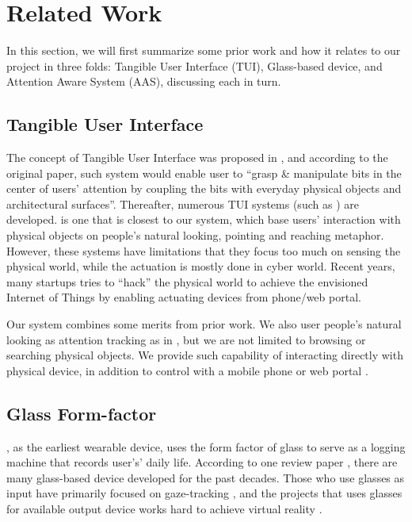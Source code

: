 \section{Related Work}
\label{sec:related-work}

In this section, we will first summarize some prior work and how it relates to our project in three folds: Tangible User Interface (TUI), Glass-based device, and Attention Aware System (AAS), discussing each in turn. 

\subsection{Tangible User Interface}
\label{sec:tang-user-interf}

The concept of Tangible User Interface was proposed in \cite{Ishii:1997:TBT:258549.258715}, and according to the original paper, such system would enable user to ``grasp \& manipulate bits in the center of users' attention by coupling the bits with everyday physical objects and architectural surfaces''. Thereafter, numerous TUI systems (such as \cite{Nanayakkara:2012:EEF:2212776.2212382, Patel:2006:IPA:2094945.2094962}) are developed. \cite{Merrill:2007:ALP:1758156.1758158} is one that is closest to our system, which base users' interaction with physical objects on people's natural looking, pointing and reaching metaphor. However, these systems have limitations that they focus too much on sensing the physical world, while the actuation is mostly done in cyber world. Recent years, many startups \cite{SmartThings, NinjaBlocks, Lockitron} tries to ``hack'' the physical world to achieve the envisioned Internet of Things by enabling actuating devices from phone/web portal. 

Our system combines some merits from prior work. We also user people's natural looking as attention tracking as in \cite{Merrill:2007:ALP:1758156.1758158}, but we are not limited to browsing or searching physical objects. We provide such capability of interacting directly with physical device, in addition to control with a mobile phone or web portal \cite{SmartThings, NinjaBlocks}.

\subsection{Glass Form-factor}
\label{sec:glass-form-factor}

\cite{mann2004continuous}, as the earliest wearable device, uses the form factor of glass to serve as a logging machine that records user's’ daily life. According to one review paper \cite{morris2010emerging}, there are many glass-based device developed for the past decades. Those who use glasses as input have primarily focused on gaze-tracking \cite{Selker:2001:EGE:634067.634176, Nagamatsu:2010:MDG:1753846.1753983}, and the projects that uses glasses for available output device works hard to achieve virtual reality \cite{Lumus, GoogleGlass}.

